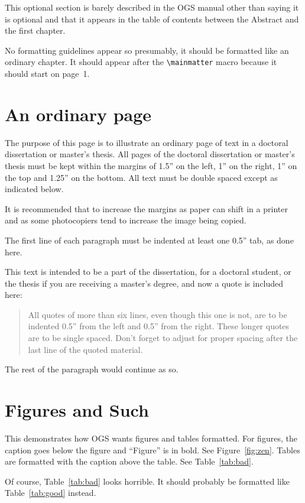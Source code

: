 \documentclass[12pt]{ucsddissertation}
\begin{document}
\begin{dissertationintroduction}
This optional section is barely described in the OGS manual other than
saying it is optional and that it appears in the table of contents
between the Abstract and the first chapter.

No formatting guidelines appear so presumably, it should be formatted
like an ordinary chapter. It should appear after the
\verb!\mainmatter! macro because it should start on page~1.
\end{dissertationintroduction}

\chapter{An ordinary page}
The purpose of this page is to illustrate an ordinary page of text in
a doctoral dissertation or master's thesis. All pages of the doctoral
dissertation or master's thesis must be kept within the margins of
1.5'' on the left, 1'' on the right, 1'' on the top and 1.25'' on the
bottom. All text must be double spaced except as indicated below.

It is recommended that to increase the margins as paper can shift in a
printer and as some photocopiers tend to increase the image being
copied.

The first line of each paragraph must be indented at least one 0.5''
tab, as done here.

This text is intended to be a part of the dissertation, for a doctoral
student, or the thesis if you are receiving a master's degree, and now
a quote is included here:
\begin{quote}
All quotes of more than six lines, even though this one is not, are to
be indented 0.5'' from the left and 0.5'' from the right. These longer
quotes are to be single spaced. Don't forget to adjust for proper
spacing after the last line of the quoted material.
\end{quote}
The rest of the paragraph would continue as so.

\chapter{Figures and Such}
This demonstrates how OGS wants figures and tables formatted. For
figures, the caption goes below the figure and ``Figure'' is in bold.
See Figure~\ref{fig:zen}. Tables are formatted with the caption above
the table. See Table~\ref{tab:bad}.

Of course, Table~\ref{tab:bad} looks horrible. It should probably be
formatted like Table~\ref{tab:good} instead.
\end{document}
